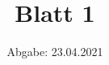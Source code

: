 

\title{Blatt 1}
\date{%
  Abgabe: 23.04.2021
}



\maketitle
\thispagestyle{empty}
\tableofcontents
\newpage





\printbibliography{}

